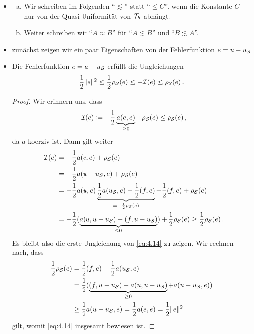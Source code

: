 \begin{itemize}
\item 
\begin{notation}
\begin{enumerate}[(a)]
\item Wir schreiben im Folgenden "`$\lesssim$"' statt "`$\le C$"', wenn die Konstante $C$ nur von der Quasi-Uniformität von $\mathcal T_h$ abhängt.
\item Weiter schreiben wir "`$A \approx B$"' für "`$A\lesssim B$"' und "`$B \lesssim A$"'.
\end{enumerate}
\end{notation}

\item zunächst zeigen wir ein paar Eigenschaften von der Fehlerfunktion $e = u-u_{\mathcal S}$

\item
\begin{lemma}\label{lem:4.12}
Die Fehlerfunktion $e = u-u_{\mathcal S}$ erfüllt die Ungleichungen
\begin{align}\label{eq:4.14}
	\frac 12 \lVert e\rVert^2 \le \frac 12 \rho_{\mathcal S}(e) \le -\mathcal I (e) \le \rho_{\mathcal S}(e) \, .
\end{align}
\end{lemma}

\begin{proof}
Wir erinnern uns, dass
\[
	-\mathcal I (e) \coloneqq - \frac 12 \underbrace{a(e,e)}_{\ge 0} + \rho_{\mathcal S} (e) \le \rho_{\mathcal S}(e) \, , 
\]
da $a$ koerziv ist. Dann gilt weiter
\begin{align*}
	-\mathcal I(e) & = - \frac 12 a(e,e) + \rho_{\mathcal S} (e) \\
	& = -\frac 1 2 a(u-u_{\mathcal S},e) + \rho_{\mathcal S} (e) \\
	& = -\frac 1 2 a(u,e) \underbrace{\frac 1 2 a(u_{\mathcal S},e)-\frac 1 2(f,e)}_{=-\frac 12 \rho_{\mathcal S}(e)} + \frac 1 2 (f,e)+\rho_{\mathcal S}(e) \\
	& = -\frac 12 (\underbrace{a(u,u-u_{\mathcal S})-(f,u-u_{\mathcal S})}_{\le 0}) + \frac 1 2\rho_{\mathcal S}(e) \ge \frac 1 2\rho_{\mathcal S}(e) \, .
\end{align*}
Es bleibt also die erste Ungleichung von \eqref{eq:4.14} zu zeigen. Wir rechnen nach, dass
\begin{align*}
	\frac 1 2 \rho_{\mathcal S} (e) &= \frac 1 2 (f,e)-\frac 1 2a(u_{\mathcal S},e) \\
	& = \frac 1 2 (\underbrace{(f,u-u_{\mathcal S}) - a(u,u-u_{\mathcal S})}_{\ge 0} + a(u-u_{\mathcal S},e)) \\
	& \ge \frac 1 2 a(u-u_{\mathcal S},e) =\frac 1 2 a(e,e) =  \frac 1 2 \lVert e\rVert^2 
\end{align*}
gilt, womit \eqref{eq:4.14} insgesamt bewiesen ist.
\end{proof}


\end{itemize}
